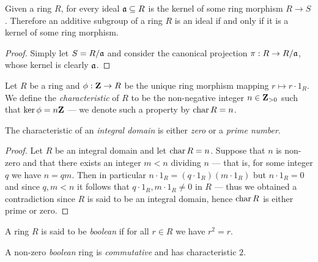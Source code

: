 \begin{corollary}
\label{cor:ideal-is-kernel}
Given a ring \(R\), for every ideal \(\mathfrak{a} \subseteq R\) is the kernel of
some ring morphism \(R \to S\). Therefore an additive subgroup of a ring \(R\)
is an ideal if and only if it is a kernel of some ring morphism.
\end{corollary}

\begin{proof}
Simply let \(S = R/\mathfrak{a}\) and consider the canonical projection \(\pi: R
\to R/\mathfrak{a}\), whose kernel is clearly \(\mathfrak{a}\).
\end{proof}

\begin{definition}[Characteristic]
\label{def:ring-characteristic}
Let \(R\) be a ring and \(\phi: \mathbf{Z} \to R\) be the unique ring morphism
mapping \(r \mapsto r \cdot 1_R\). We define the \emph{characteristic} of \(R\)
to be the non-negative integer \(n \in \mathbf{Z}_{> 0}\) such that \(\ker \phi = n \mathbf{Z}\)
--- we denote such a property by \(\operatorname{char} R = n\).
\end{definition}

\begin{proposition}
\label{prop:char-integral-domain-is-0-or-p}
The characteristic of an \emph{integral domain} is either \emph{zero} or a
\emph{prime number}.
\end{proposition}

\begin{proof}
Let \(R\) be an integral domain and let \(\operatorname{char} R = n\). Suppose that \(n\) is
non-zero and that there exists an integer \(m < n\) dividing \(n\) --- that is,
for some integer \(q\) we have \(n = q m\). Then in particular
\(n \cdot 1_R = (q \cdot 1_R) (m \cdot 1_R)\) but \(n \cdot 1_R = 0\) and since
\(q, m < n\) it follows that \(q \cdot 1_R, m \cdot 1_R \neq 0\) in \(R\) ---
thus we obtained a contradiction since \(R\) is said to be an integral domain,
hence \(\operatorname{char} R\) is either prime or zero.
\end{proof}

\begin{definition}
\label{def:boolean-ring}
A ring \(R\) is said to be \emph{boolean} if for all \(r \in R\) we have
\(r^2 = r\).
\end{definition}

\begin{corollary}
\label{cor:boolean-is-commutative-and-char-2}
A non-zero \emph{boolean} ring is \emph{commutative} and has characteristic
\(2\).
\end{corollary}

